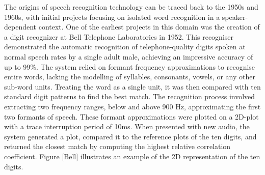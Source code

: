 The origins of speech recognition technology can be traced back to the 1950s and 1960s, with initial projects focusing on isolated word recognition in a speaker-dependent context. One of the earliest projects in this domain was the creation of a digit recognizer at Bell Telephone Laboratories in 1952. This recogniser demonstrated the automatic recognition of telephone-quality digits spoken at normal speech rates by a single adult male, achieving an impressive accuracy of up to 99\%. The system relied on formant frequency approximations to recognise entire words, lacking the modelling of syllables, consonants, vowels, or any other sub-word units. Treating the word as a single unit, it was then compared with ten standard digit patterns to find the best match. The recognition process involved extracting two frequency ranges, below and above 900 Hz, approximating the first two formants of speech. These formant approximations were plotted on a 2D-plot with a trace interruption period of 10ms. When presented with new audio, the system generated a plot, compared it to the reference plots of the ten digits, and returned the closest match by computing the highest relative correlation coefficient. Figure \ref{Bell} illustrates an example of the 2D representation of the ten digits.


